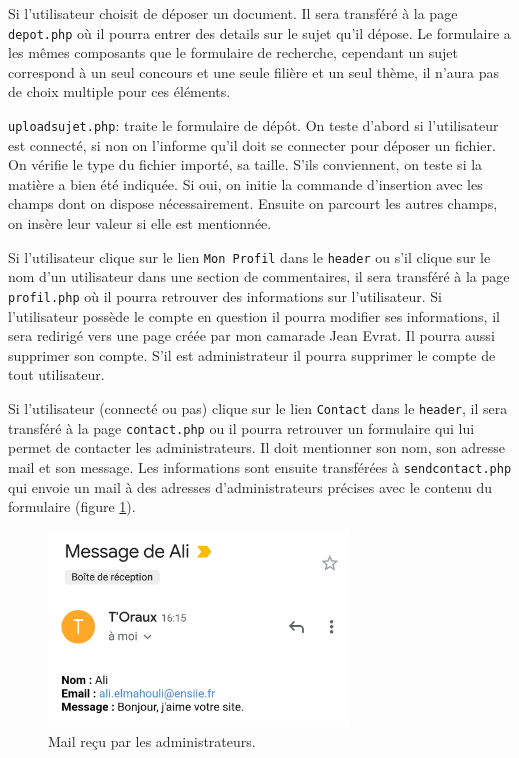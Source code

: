 \documentclass{article}
\begin{document}
Si l'utilisateur choisit de déposer un document. Il sera transféré à la page \texttt{depot.php} où il pourra entrer des details sur le sujet qu'il dépose. Le formulaire a les mêmes composants que le formulaire de recherche, cependant un sujet correspond à un seul concours et une seule filière et un seul thème, il n'aura pas de choix multiple pour ces éléments.

\texttt{uploadsujet.php}: traite le formulaire de dépôt. On teste d'abord si l'utilisateur est connecté, si non on l'informe qu'il doit se connecter pour déposer un fichier. On vérifie le type du fichier importé, sa taille. S'ils conviennent, on teste si la matière a bien été indiquée. Si oui, on initie la commande d'insertion avec les champs dont on dispose nécessairement. Ensuite on parcourt les autres champs, on insère leur valeur si elle est mentionnée.

Si l'utilisateur clique sur le lien \texttt{Mon Profil} dans le \texttt{header} ou s'il clique sur le nom d'un utilisateur dans une section de commentaires, il sera transféré à la page \texttt{profil.php} où il pourra retrouver des informations sur l'utilisateur. Si l'utilisateur possède le compte en question il pourra modifier ses informations, il sera redirigé vers une page créée par mon camarade Jean Evrat. Il pourra aussi supprimer son compte. S'il est administrateur il pourra supprimer le compte de tout utilisateur.

Si l'utilisateur (connecté ou pas) clique sur le lien \texttt{Contact} dans le \texttt{header}, il sera transféré à la page \texttt{contact.php} ou il pourra retrouver un formulaire qui lui permet de contacter les administrateurs. Il doit mentionner son nom, son adresse mail et son message. Les informations sont ensuite transférées à \texttt{sendcontact.php} qui envoie un mail à des adresses d'administrateurs précises avec le contenu du formulaire (figure \ref{commentaire}).

\begin{figure}[h]
\centering
\includegraphics[width=8cm]{commentaire.jpg}
\caption{Mail reçu par les administrateurs.}
\label{commentaire}
\end{figure}
\end{document}
